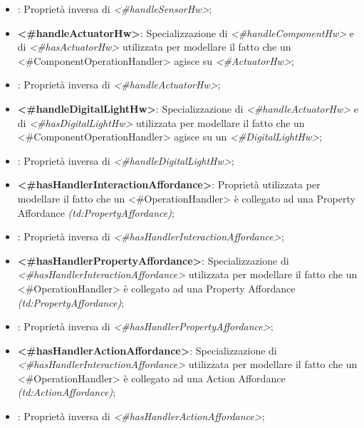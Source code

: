 \begin{itemize}
	\item {}: Proprietà inversa di \textit{<\#handleSensorHw>};

	\item \textbf{<\#handleActuatorHw>}: Specializzazione di \textit{<\#handleComponentHw>} e di \textit{<\#hasActuatorHw>} utilizzata per modellare il fatto che un <\#ComponentOperationHandler> agisce su \textit{<\#ActuatorHw>};

	\item {}: Proprietà inversa di \textit{<\#handleActuatorHw>};

	\item \textbf{<\#handleDigitalLightHw>}: Specializzazione di \textit{<\#handleActuatorHw>} e di \textit{<\#hasDigitalLightHw>} utilizzata per modellare il fatto che un <\#ComponentOperationHandler> agisce su un \textit{<\#DigitalLightHw>};

	\item {}: Proprietà inversa di \textit{<\#handleDigitalLightHw>};

	\item \textbf{<\#hasHandlerInteractionAffordance>}:  Proprietà utilizzata per modellare il fatto che un <\#OperationHandler> è collegato ad una Property Affordance \textit{(td:PropertyAffordance)};

	\item {}: Proprietà inversa di \textit{<\#hasHandlerInteractionAffordance>};

	\item \textbf{<\#hasHandlerPropertyAffordance>}: Specializzazione di \textit{<\#hasHandlerInteractionAffordance>} utilizzata per modellare il fatto che un <\#OperationHandler> è collegato ad una Property Affordance \textit{(td:PropertyAffordance)};

	\item {}: Proprietà inversa di \textit{<\#hasHandlerPropertyAffordance>};

	\item \textbf{<\#hasHandlerActionAffordance>}: Specializzazione di \textit{<\#hasHandlerInteractionAffordance>} utilizzata per modellare il fatto che un <\#OperationHandler> è collegato ad una Action Affordance \textit{(td:ActionAffordance)};

	\item {}: Proprietà inversa di \textit{<\#hasHandlerActionAffordance>};


\end{itemize}
